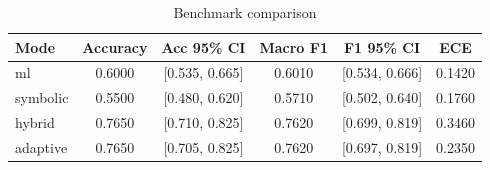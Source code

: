 \begin{table}[t]
\centering
\caption{Benchmark comparison}
\label{tab:table2_benchmark_comparison}
\begin{tabular}{lccccc}
\toprule
Mode & Accuracy & Acc 95\% CI & Macro F1 & F1 95\% CI & ECE \\
\midrule
ml & 0.6000 & [0.535, 0.665] & 0.6010 & [0.534, 0.666] & 0.1420 \\
symbolic & 0.5500 & [0.480, 0.620] & 0.5710 & [0.502, 0.640] & 0.1760 \\
hybrid & 0.7650 & [0.710, 0.825] & 0.7620 & [0.699, 0.819] & 0.3460 \\
adaptive & 0.7650 & [0.705, 0.825] & 0.7620 & [0.697, 0.819] & 0.2350 \\
\bottomrule
\end{tabular}
\end{table}
